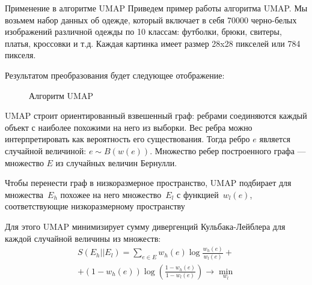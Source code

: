 \documentclass[final]{beamer}
\newlength{\onecolwid}
\begin{document}
\begin{frame}[t]
\begin{columns}[t]
\begin{column}{\onecolwid}
\begin{block}{Применение в алгоритме UMAP}
Приведем пример работы алгоритма UMAP. Мы возьмем набор данных об одежде, который включает в себя 70000 черно-белых изображений различной одежды по 10 классам: футболки, брюки, свитеры, платья, кроссовки и т.д. Каждая картинка имеет размер 28x28 пикселей или 784 пикселя.

Результатом преобразования будет следующее отображение:

\begin{figure}[!h]
	\noindent{}
	\caption{Алгоритм UMAP}
	\label{figCurves}
\end{figure} 

UMAP строит ориентированный взвешенный граф: ребрами соединяются каждый объект с наиболее похожими на него из выборки. Вес ребра можно интерпретировать как вероятность его существования. Тогда ребро $e$ является случайной величиной: $e \sim B(w(e))$. Множество ребер построенного графа --- множество $E$ из случайных величин Бернулли.

Чтобы перенести граф в низкоразмерное пространство, UMAP подбирает для множества~$E_h$ похожее на него множество~$E_l$ с функцией~$w_l(e)$, соответствующие низкоразмерному пространству

Для этого UMAP минимизирует сумму дивергенций Кульбака-Лейблера для каждой случайной величины из множеств:
\begin{multline*}
	S(E_h||E_l) = \sum_{e \in E} w_h(e) \log \frac{w_h(e)}{w_l(e)} + \\ + (1 - w_h(e)) \log \left(\frac{1 - w_h(e)}{1 - w_l(e)}\right) \rightarrow \min_{w_l}
\end{multline*}


\end{block}
\end{column}
\end{columns}
\end{frame}
\end{document}

